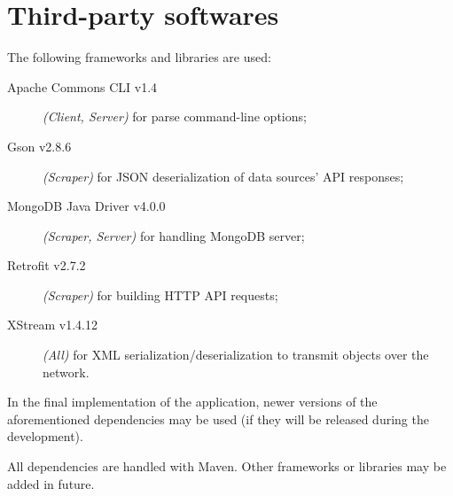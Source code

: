 \section{Third-party softwares}\label{sec:dependencies}

The following frameworks and libraries are used:
\begin{description}
	\item[Apache Commons CLI v1.4] \textit{(Client, Server)} for parse
		command-line options;
	\item[Gson v2.8.6] \textit{(Scraper)} for JSON deserialization of data
		sources' API responses;
	\item[MongoDB Java Driver v4.0.0] \textit{(Scraper, Server)} for
		handling MongoDB server;
	\item[Retrofit v2.7.2] \textit{(Scraper)} for building HTTP API
		requests;
	\item[XStream v1.4.12] \textit{(All)} for XML
		serialization/deserialization to transmit objects over the
		network.
\end{description}

In the final implementation of the application, newer versions of the
aforementioned dependencies may be used (if they will be released during the
development).

All dependencies are handled with Maven. Other frameworks or libraries may be
added in future.
